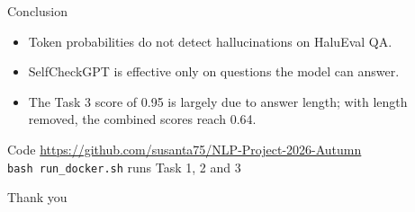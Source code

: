 \documentclass[aspectratio=169,10pt]{beamer}
\begin{document}
\begin{frame}{Conclusion}
\begin{itemize}
  \item Token probabilities do not detect hallucinations on HaluEval QA.
  \item SelfCheckGPT is effective only on questions the model can answer.
  \item The Task 3 score of 0.95 is largely due to answer length; with length removed, the
        combined scores reach 0.64.
\end{itemize}
\vspace{10pt}
\begin{block}{Code}
\centering
\url{https://github.com/susanta75/NLP-Project-2026-Autumn}\\[2pt]
\texttt{bash run\_docker.sh} \quad runs Task 1, 2 and 3
\end{block}
\vspace{10pt}
\centering\Large Thank you
\end{frame}
\end{document}
